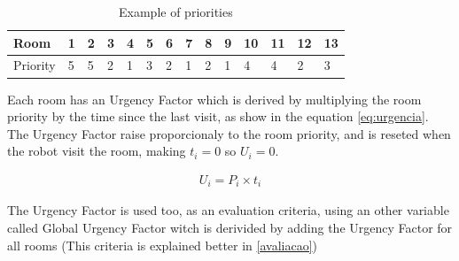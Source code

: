 \documentclass[9pt,journal]{IEEEtran}
\begin{document}
\begin{table}%
\centering
\caption{Example of priorities}
\begin{tabular}{|l|l|l|l|l|l|l|l|l|l|l|l|l|l|}
\hline
Room & 1 & 2 & 3 & 4 & 5 & 6 & 7 & 8 & 9 & 10 & 11 & 12 & 13 \\ 
\hline
Priority & 5 & 5 & 2 & 1 & 3 & 2 & 1 & 2 & 1 & 4 & 4 & 2 & 3 \\ 
\hline
\end{tabular}
\label{tab:exemplo}
\end{table}

Each room has an Urgency Factor which is derived by multiplying the room priority by the time since the last visit, as show in the equation \ref{eq:urgencia}. The Urgency Factor raise proporcionaly to the room priority, and is reseted when the robot visit the room, making $t_i=0$ so $U_i = 0$.

\begin{eqnarray}
U_i= P_i \times t_i
\label{eq:urgencia}
\end{eqnarray}

The Urgency Factor is used too, as an evaluation criteria, using an other variable called Global Urgency Factor witch is derivided by adding the Urgency Factor for all rooms (This criteria is explained better in \ref{avaliacao})







	
	
\end{document}
